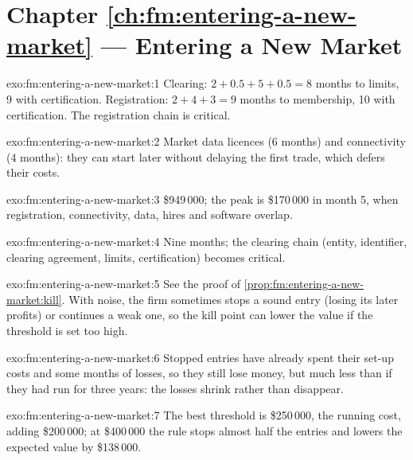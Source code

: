\section*{Chapter \ref{ch:fm:entering-a-new-market} --- Entering a New Market}

\begin{solution}{exo:fm:entering-a-new-market:1}
Clearing: $2+0.5+5+0.5=8$ months to limits, 9 with certification. Registration: $2+4+3=9$ months to membership, 10 with certification. The
registration chain is critical.
\end{solution}

\begin{solution}{exo:fm:entering-a-new-market:2}
Market data licences (6 months) and connectivity (4 months): they can start later without delaying the first trade, which defers their costs.
\end{solution}

\begin{solution}{exo:fm:entering-a-new-market:3}
\$949\,000; the peak is \$170\,000 in month 5, when registration, connectivity, data, hires and software overlap.
\end{solution}

\begin{solution}{exo:fm:entering-a-new-market:4}
Nine months; the clearing chain (entity, identifier, clearing agreement, limits, certification) becomes critical.
\end{solution}

\begin{solution}{exo:fm:entering-a-new-market:5}
See the proof of \cref{prop:fm:entering-a-new-market:kill}. With noise, the firm sometimes stops a sound entry (losing its later profits) or
continues a weak one, so the kill point can lower the value if the threshold is set too high.
\end{solution}

\begin{solution}{exo:fm:entering-a-new-market:6}
Stopped entries have already spent their set-up costs and some months of losses, so they still lose money, but much less than if they had run for
three years: the losses shrink rather than disappear.
\end{solution}

\begin{solution}{exo:fm:entering-a-new-market:7}
The best threshold is \$250\,000, the running cost, adding \$200\,000; at \$400\,000 the rule stops almost half the entries and lowers the expected
value by \$138\,000.
\end{solution}

